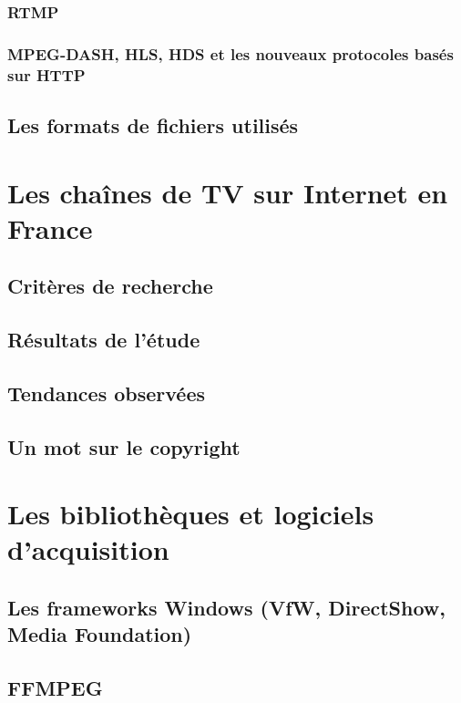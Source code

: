 \documentclass{polytech/polytech}
\begin{document}
\subsection{RTMP}

\subsection{MPEG-DASH, HLS, HDS et les nouveaux protocoles basés sur HTTP}
\label{subsec:newProto}


\section{Les formats de fichiers utilisés}


\chapter{Les chaînes de TV sur Internet en France}


\section{Critères de recherche}


\section{Résultats de l'étude}


\section{Tendances observées}


\section{Un mot sur le copyright}


\chapter{Les bibliothèques et logiciels d'acquisition}


\section{Les frameworks Windows (VfW, DirectShow, Media Foundation)}

\section{FFMPEG}
\end{document}
